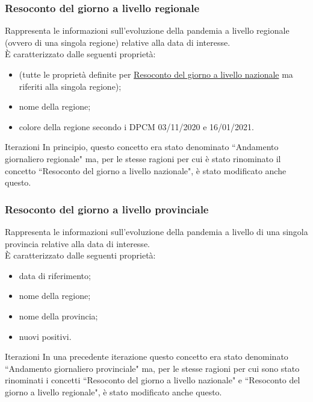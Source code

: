 \subsubsection{Resoconto del giorno a livello regionale}
\label{sss:resoconto-del-giorno-livello-regionale}
Rappresenta le informazioni sull'evoluzione della pandemia a livello regionale (ovvero di una singola regione) relative alla data di interesse.\\
È caratterizzato dalle seguenti proprietà:
\begin{itemize}
    \item (tutte le proprietà definite per \hyperref[sss:resoconto-del-giorno-livello-nazionale]{Resoconto del giorno a livello nazionale} ma riferiti alla singola regione);
    \item nome della regione;
    \item colore della regione secondo i DPCM 03/11/2020 e 16/01/2021.
\end{itemize}
\begin{bclogo}{Iterazioni}
In principio, questo concetto era stato denominato ``Andamento giornaliero regionale" ma, per le stesse ragioni per cui è stato rinominato il concetto ``Resoconto del giorno a livello nazionale", è stato modificato anche questo.
\end{bclogo}

\subsubsection{Resoconto del giorno a livello provinciale}
\label{sss:resoconto-del-giorno-livello-provinciale}
Rappresenta le informazioni sull'evoluzione della pandemia a livello di una singola provincia relative alla data di interesse.\\
È caratterizzato dalle seguenti proprietà:
\begin{itemize}
    \item data di riferimento;
    \item nome della regione;
    \item nome della provincia;
    \item nuovi positivi.
\end{itemize}
\begin{bclogo}{Iterazioni}
In una precedente iterazione questo concetto era stato denominato ``Andamento giornaliero provinciale" ma, per le stesse ragioni per cui sono stato rinominati i concetti ``Resoconto del giorno a livello nazionale" e ``Resoconto del giorno a livello regionale", è stato modificato anche questo.
\end{bclogo}

